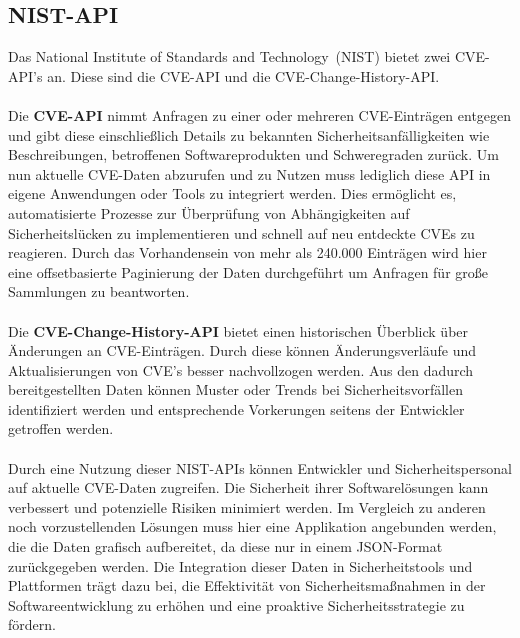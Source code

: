 \subsection{NIST-API} \label{sec:NIST-API}
Das \glqq National Institute of Standards and Technology\grqq~(NIST) bietet zwei CVE-API's an.
Diese sind die CVE-API und die CVE-Change-History-API.
\\ \\
Die \textbf{CVE-API} nimmt Anfragen zu einer oder mehreren CVE-Einträgen entgegen und gibt diese einschließlich Details zu bekannten Sicherheitsanfälligkeiten wie Beschreibungen, betroffenen Softwareprodukten und Schweregraden zurück.
Um nun aktuelle CVE-Daten abzurufen und zu Nutzen muss lediglich diese API in eigene Anwendungen oder Tools zu integriert werden.
Dies ermöglicht es, automatisierte Prozesse zur Überprüfung von Abhängigkeiten auf Sicherheitslücken zu implementieren und schnell auf neu entdeckte CVEs zu reagieren.
Durch das Vorhandensein von mehr als 240.000 Einträgen wird hier eine offsetbasierte Paginierung der Daten durchgeführt um Anfragen für große Sammlungen zu beantworten.
\\ \\
Die \textbf{CVE-Change-History-API} bietet einen historischen Überblick über Änderungen an CVE-Einträgen.
Durch diese können Änderungsverläufe und Aktualisierungen von CVE's besser nachvollzogen werden.
Aus den dadurch bereitgestellten Daten können Muster oder Trends bei Sicherheitsvorfällen identifiziert werden und entsprechende Vorkerungen seitens der Entwickler getroffen werden.
\\ \\
Durch eine Nutzung dieser NIST-APIs können Entwickler und Sicherheitspersonal auf aktuelle CVE-Daten zugreifen.
Die Sicherheit ihrer Softwarelösungen kann verbessert und potenzielle Risiken minimiert werden.
Im Vergleich zu anderen noch vorzustellenden Lösungen muss hier eine Applikation angebunden werden, die die Daten grafisch aufbereitet, da diese nur in einem JSON-Format zurückgegeben werden. 
Die Integration dieser Daten in Sicherheitstools und Plattformen trägt dazu bei, die Effektivität von Sicherheitsmaßnahmen in der Softwareentwicklung zu erhöhen und eine proaktive Sicherheitsstrategie zu fördern.



